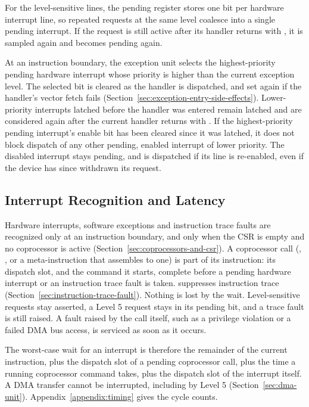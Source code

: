 For the level-sensitive lines, the pending register stores one bit per hardware interrupt line, so repeated requests at
the same level coalesce into a single pending interrupt. If the request is still active after its handler returns with
, it is sampled again and becomes pending again.

At an instruction boundary, the exception unit selects the highest-priority pending hardware interrupt whose priority
is higher than the current exception level. The selected bit is cleared as the handler is dispatched, and set again if
the handler's vector fetch fails (Section~\ref{sec:exception-entry-side-effects}). Lower-priority interrupts latched
before the handler was entered remain latched and are considered again after the current handler returns with
. If the highest-priority pending interrupt's enable bit has been cleared since it was latched, it does
not block dispatch of any other pending, enabled interrupt of lower priority. The disabled interrupt stays pending, and
is dispatched if its line is re-enabled, even if the device has since withdrawn its request.

\subsection{Interrupt Recognition and Latency}
\label{sec:interrupt-latency}

Hardware interrupts, software exceptions and instruction trace faults are recognized only at an instruction boundary,
and only when the CSR is empty and no coprocessor is active (Section~\ref{sec:coprocessors-and-csr}). A coprocessor
call (, , or a meta-instruction that assembles to one) is part of its instruction: its
dispatch slot, and the command it starts, complete before a pending hardware interrupt or an instruction trace fault is
taken.  suppresses instruction trace (Section~\ref{sec:instruction-trace-fault}). Nothing is lost by the
wait. Level-sensitive requests stay asserted, a Level 5 request stays in its pending bit, and a trace fault is still
raised. A fault raised by the call itself, such as a privilege violation or a failed DMA bus access, is serviced as
soon as it occurs.

The worst-case wait for an interrupt is therefore the remainder of the current instruction, plus the dispatch slot of a
pending coprocessor call, plus the time a running coprocessor command takes, plus the dispatch slot of the interrupt
itself. A DMA transfer cannot be interrupted, including by Level 5 (Section~\ref{sec:dma-unit}).
Appendix~\ref{appendix:timing} gives the cycle counts.

